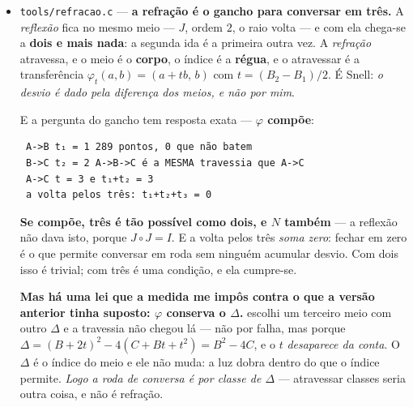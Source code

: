 \documentclass[11pt]{article}
\newcommand{\code}[1]{\texttt{\small #1}}
\theoremstyle{plain}
\theoremstyle{remark}
\begin{document}
\begin{itemize}
\textbf{E o ``não sei'' deixou de ser o fim: passou a ser o fim do que \emph{} sei.} O decreto só
fala depois de o barramento se calar --- \emph{recusar-se a inventar não é recusar-se a perguntar}.

\textbf{E quando duas sabem, quem decide é a régua.} A primeira versão ficava com a primeira
resposta que o \code{readdir} devolvesse --- isso é deixar o \emph{sistema de ficheiros} fazer de
régua. Decide a \textbf{profundidade do caminho}: quem casou mais símbolos sabe mais daquela fala.

O que mais vale nisto: \emph{o corpus cresce sem ninguém o escrever}. A Bia aprendeu da Ana pela
mesma operação com que responde --- não houve importação, não houve sincronização, não houve
segunda estrutura a manter em dia.

\item \code{tools/refracao.c} --- \textbf{a refração é o gancho para conversar em três.} A
\emph{reflexão} fica no mesmo meio --- $J$, ordem $2$, o raio volta --- e com ela chega-se a
\textbf{dois e mais nada}: a segunda ida é a primeira outra vez. A \emph{refração} atravessa, e o
meio é o \textbf{corpo}, o índice é a \textbf{régua}, e o atravessar é a transferência
$\varphi_t(a,b) = (a+tb,\,b)$ com $t = (B_2-B_1)/2$. É Snell: \emph{o desvio é dado pela diferença
dos meios, e não por mim}.

E a pergunta do gancho tem resposta exata --- \textbf{$\varphi$ compõe}:

\begin{verbatim}
 A->B t₁ = 1 289 pontos, 0 que não batem
 B->C t₂ = 2 A->B->C é a MESMA travessia que A->C
 A->C t = 3 e t₁+t₂ = 3
 a volta pelos três: t₁+t₂+t₃ = 0
\end{verbatim}

\textbf{Se compõe, três é tão possível como dois, e $N$ também} --- a reflexão não dava isto,
porque $J\circ J = I$. E a volta pelos três \emph{soma zero}: fechar em zero é o que permite
conversar em roda sem ninguém acumular desvio. Com dois isso é trivial; com três é uma condição, e
ela cumpre-se.

\textbf{Mas há uma lei que a medida me impôs contra o que a versão anterior tinha suposto: $\varphi$ conserva o
$\Delta$.} escolhi um terceiro meio com outro $\Delta$ e a travessia não chegou lá --- não por
falha, mas porque $\Delta = (B+2t)^2 - 4(C+Bt+t^2) = B^2-4C$, e o $t$ \emph{desaparece da conta}. O
$\Delta$ é o índice do meio e ele não muda: a luz dobra dentro do que o índice permite. \emph{Logo
a roda de conversa é por classe de $\Delta$} --- atravessar classes seria outra coisa, e não é
refração.


\end{itemize}
\end{document}
